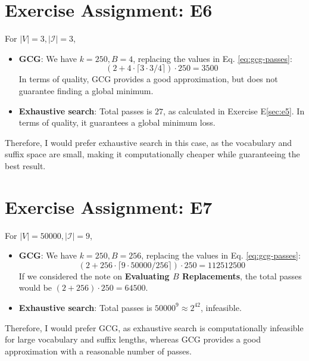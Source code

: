 \documentclass{article}
\begin{document}
\section{Exercise Assignment: E6}\label{sec:e6}
For \( |V| = 3, |\mathcal{I}| = 3\), 
\begin{itemize}
    \item \textbf{GCG}: We have $k = 250, B = 4$, replacing the values in Eq. \eqref{eq:gcg-passes}:
    \[
        \left(2 + 4 \cdot \lceil 3 \cdot 3 / 4 \rceil\right) \cdot 250 = 3500
    \]
    In terms of quality, GCG provides a good approximation, but does not guarantee finding a global minimum.
    \item \textbf{Exhaustive search}: Total passes is \(27\), as calculated in Exercise E\ref{sec:e5}. In terms of quality, it guarantees a global minimum loss.
\end{itemize}
Therefore, I would prefer exhaustive search in this case, as the vocabulary and suffix space are small, making it computationally cheaper while guaranteeing the best result.

\section{Exercise Assignment: E7}\label{sec:e7}
For \( |V| = 50000, |\mathcal{I}| = 9 \),
\begin{itemize}
    \item \textbf{GCG}: We have $k = 250, B = 256$, replacing the values in Eq. \eqref{eq:gcg-passes}:
    \[
        \left(2 + 256 \cdot \lceil 9 \cdot 50000 / 256 \rceil\right) \cdot 250 = 112512500
    \]
    If we considered the note on \textbf{Evaluating $B$ Replacements}, the total passes would be $(2 + 256) \cdot 250 = 64500$.
    \item \textbf{Exhaustive search}: Total passes is \(50000^9 \approx 2^{42}\), infeasible.
\end{itemize}

Therefore, I would prefer GCG, as exhaustive search is computationally infeasible for large vocabulary and suffix lengths, whereas GCG provides a good approximation with a reasonable number of passes.
\end{document}

